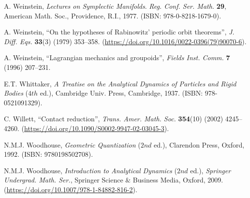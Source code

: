 \documentclass[12pt]{report}
\begin{document}
\begin{thebibliography}{999}
A. Weinstein, 
{\it Lectures on Symplectic Manifolds}.
{\sl Reg. Conf. Ser. Math.} {\bf 29}, American Math. Soc., Providence, R.I., 1977.
(ISBN: 978-0-8218-1679-0).

 A. Weinstein, 
 ``On the hypotheses of Rabinowitz' periodic orbit theorems'',
{\sl J. Diff. Eqs.} {\bf 33}(3) (1979) 353--358. 
 (\url{https://doi.org/10.1016/0022-0396(79)90070-6}).
 
A. Weinstein,
``Lagrangian mechanics and groupoids'', 
{\sl Fields Inst. Comm.} {\bf 7} (1996) 207--231.

E.T. Whittaker, {\it A Treatise on the Analytical Dynamics of Particles and Rigid Bodies} ($4th$ ed.), 
Cambridge Univ. Press, Cambridge, 1937. 
(ISBN: 978-0521091329).

C. Willett,
``Contact reduction'',
{\sl Trans. Amer. Math. Soc.} {\bf 354}(10) (2002) 4245--4260.
(\url{https://doi.org/10.1090/S0002-9947-02-03045-3}).

N.M.J. Woodhouse,
{\it Geometric Quantization}  ($2nd$ ed.), Clarendon Press, Oxford, 1992.
(ISBN: 9780198502708).

N.M.J. Woodhouse,
{\it Introduction to Analytical Dynamics}
($2nd$ ed.), 
{\sl Springer Undergrad. Math. Ser.}, 
Springer Science $\&$ Business Media, Oxford, 2009.
(\url{https://doi.org/10.1007/978-1-84882-816-2}).

\end{thebibliography}

\end{document}
